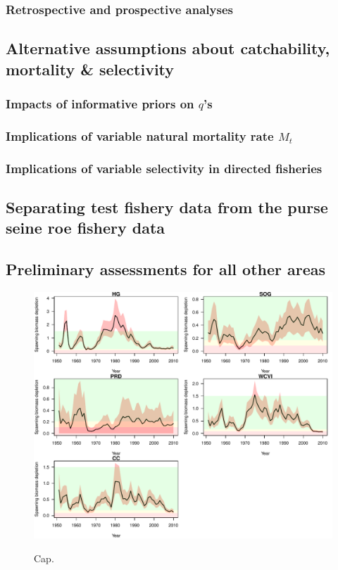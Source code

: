 		\subsubsection{Retrospective and prospective analyses}
	\subsection{Alternative assumptions about catchability, mortality \& selectivity}
		\subsubsection{Impacts of informative priors on $q$'s}
		\subsubsection{Implications of variable natural mortality rate $M_t$}
		\subsubsection{Implications of variable selectivity in directed fisheries}
	\subsection{Separating test fishery data from the purse seine roe fishery data}
	\subsection{Preliminary assessments for all other areas}
	
\begin{figure}[!tbp]
	\includegraphics[width=\textwidth]{Figs/figSBmcmc.pdf}\\
	\caption{Cap.}\label{label}
\end{figure}
